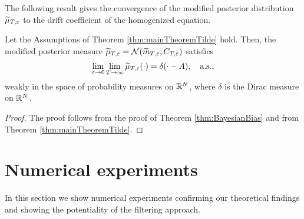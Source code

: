 \documentclass[10pt]{article}
\begin{document}
The following result gives the convergence of the modified posterior distribution $\widetilde \mu_{T, \varepsilon}$ to the drift coefficient of the homogenized equation.
\begin{theorem} Let the Assumptions of Theorem \ref{thm:mainTheoremTilde} hold. Then, the modified posterior measure $\widetilde\mu_{T,\varepsilon} = \mathcal N(\widetilde m_{T,\varepsilon}, C_{T,\varepsilon})$ satisfies
	\begin{equation}
	\lim_{\varepsilon \to 0}\lim_{T \to \infty} \widetilde \mu_{T,\varepsilon}(\cdot) = \delta(\cdot - A), \quad \text{a.s.},
	\end{equation}
	weakly in the space of probability measures on $\mathbb{R}^N$, where $\delta$ is the Dirac measure on $\mathbb{R}^N$.
\end{theorem}
\begin{proof} The proof follows from the proof of Theorem \ref{thm:BayesianBias} and from Theorem \ref{thm:mainTheoremTilde}.
\end{proof}


\section{Numerical experiments}\label{sec:NumExp}

In this section we show numerical experiments confirming our theoretical findings and showing the potentiality of the filtering approach.
\end{document}
